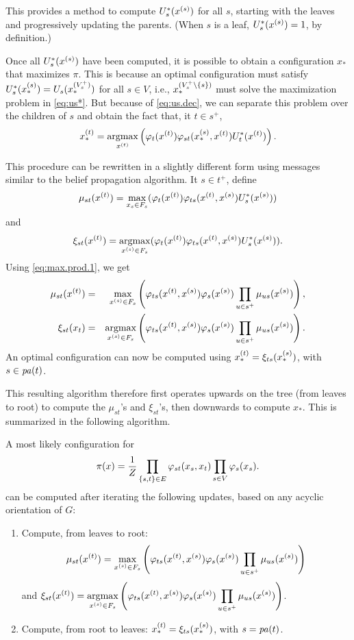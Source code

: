 This provides a
method to compute $U^*_{s}(x^{(s)})$ for all $s$, starting with the leaves and
progressively updating the parents. (When $s$ is a leaf, $U_s^*(x^{(s)}) = 1$, by definition.)

Once all $U^*_s(x^{(s)})$ have been computed, it is possible to obtain a
configuration $x_*$ that maximizes $\pi$. This is because an
optimal configuration must satisfy
$U^*_s(x^{(s)}_*) = U_s(x^{(V^+_s)}_*)$ for all $s\in V$, i.e., $x^{(V^+_s\setminus\{s\})}_*$ must
solve the maximization problem in \cref{eq:us*}. But because of
\cref{eq:us.dec}, we can separate this problem over the children of
$s$ and obtain the fact that, it $t\in s^+$,
$$
x^{(t)}_* = \mathop{\mathrm{argmax}}_{x^{(t)}} \left(\varphi_t(x^{(t)}) \varphi_{st}(x^{(s)}_*,x^{(t)})U_t^*(x^{(t)})\right).
$$

This procedure can be rewritten in a slightly different form using messages similar to the belief propagation algorithm. It $s \in t^+$, define 
\[
\mu_{st}(x^{(t)}) = \max_{x_s\in F_s}(\varphi_t(x^{(t)})\varphi_{ts}(x^{(t)}, x^{(s)}) U^*_s(x^{(s)}))
\]
and
\[
\xi_{st}(x^{(t)}) = \mathop{\mathrm{argmax}}_{x^{(s)}\in F_s}(\varphi_t(x^{(t)}) \varphi_{ts}(x^{(t)}, x^{(s)}) U^*_s(x^{(s)})).
\]
Using \cref{eq:max.prod.1}, we get
\begin{eqnarray*}
\mu_{st}(x^{(t)}) &=& \max_{x^{(s)}\in F_s}\left(\varphi_{ts}(x^{(t)},x^{(s)})\varphi_s(x^{(s)}) \prod_{u\in s^+} \mu_{us}(x^{(s)})\right),\\
\xi_{st}(x_t) &=& \mathop{\mathrm{argmax}}_{x^{(s)}\in F_s}\left(\varphi_{ts}(x^{(t)}, x^{(s)})\varphi_s(x^{(s)}) \prod_{u\in s^+} \mu_{us}(x^{(s)})\right).
\end{eqnarray*}
An optimal configuration can now be computed using $x^{(t)}_* = \xi_{ts}(x^{(s)}_*)$, with $s \in {\mathit{pa}(t)}$.

This resulting algorithm therefore first operates upwards on the tree
(from leaves to root) to compute the $\mu_{st}$'s and $\xi_{st}$'s, then downwards to
compute $x_*$. This is summarized in the following algorithm.
\begin{algorithm}
\label{alg:dyn.prog}
A most likely configuration for 
$$
\pi(x) = \frac{1}{Z} \prod_{\left\{ s,t \right\}\in E} \varphi_{st}(x_s,x_t)
\prod_{s\in V} \varphi_s(x_s).
$$
can be computed after iterating the following updates, based on any acyclic orientation of $G$:
\begin{enumerate}
\item Compute, from leaves to root: 
\[
\displaystyle \mu_{st}(x^{(t)}) = \max_{x^{(s)}\in F_s}\left(\varphi_{ts}(x^{(t)}, x^{(s)})\varphi_s(x^{(s)}) \prod_{u\in s^+} \mu_{us}(x^{(s)})\right)
\]
 and $\displaystyle \xi_{st}(x^{(t)}) = \mathop{\mathrm{argmax}}_{x^{(s)}\in F_s}\left(\varphi_{ts}(x^{(t)},x^{(s)})\varphi_s(x^{(s)}) \prod_{u\in s^+} \mu_{us}(x^{(s)})\right)$.
\item Compute, from root to leaves: $x^{(t)}_* = \xi_{ts}(x^{(s)}_*)$, with $s = {\mathit{pa}(t)}$.
\end{enumerate}
\end{algorithm}

